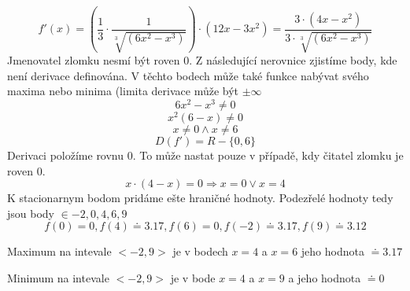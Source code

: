 \begin{displaymath}
f'(x)=\left(\frac{1}{3}\cdot\frac{1}{\sqrt[3]{(6x^2-x^3)}}\right)\cdot(12x-3x^2)=\frac{3\cdot(4x-x^2)}{3\cdot\sqrt[3]{(6x^2-x^3)}}
\end{displaymath}
Jmenovatel zlomku nesmí být roven 0. Z následující nerovnice zjistíme body, kde není derivace definována. V těchto bodech může také funkce nabývat svého maxima nebo minima (limita derivace může být $\pm \infty$
\begin{displaymath}
6x^2-x^3\neq0
\end{displaymath}
\begin{displaymath}
x^2(6-x)\neq0
\end{displaymath}
\begin{displaymath}
x\neq0 \wedge  x\neq6
\end{displaymath}
\begin{displaymath}
D(f')=R-\{0,6\}
\end{displaymath}
Derivaci položíme rovnu 0. To může nastat pouze v případě, kdy čitatel zlomku je roven 0.
\begin{displaymath}
x\cdot(4-x) = 0 \Rightarrow x = 0 \vee x = 4
\end{displaymath}
K stacionarnym bodom pridáme ešte hraničné hodnoty. 
Podezřelé hodnoty tedy jsou body $ \in{-2,0,4,6,9} $
\begin{displaymath}
f(0) = 0, f(4) \doteq 3.17, f(6) = 0, f(-2) \doteq 3.17, f(9) \doteq 3.12
\end{displaymath}

Maximum na intevale $ <-2,9>$ je v bodech $x=4$ a $x=6$ jeho hodnota $\doteq 3.17$

Minimum na intevale $ <-2,9>$ je v bode $x=4$ a $x=9$ a jeho hodnota $\doteq 0$